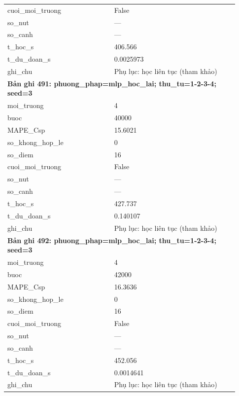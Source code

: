 \begin{longtable}{p{0.43\linewidth}p{0.50\linewidth}}
cuoi\_\allowbreak moi\_\allowbreak truong & False \\
so\_\allowbreak nut & — \\
so\_\allowbreak canh & — \\
t\_\allowbreak hoc\_\allowbreak s & 406.566 \\
t\_\allowbreak du\_\allowbreak doan\_\allowbreak s & 0.0025973 \\
ghi\_\allowbreak chu & Phụ lục: học liên tục (tham khảo) \\
\midrule
\multicolumn{2}{p{0.95\linewidth}}{\textbf{Bản ghi 491: phuong\_phap=mlp\_hoc\_lai; thu\_tu=1-2-3-4; seed=3}} \\
moi\_\allowbreak truong & 4 \\
buoc & 40000 \\
MAPE\_\allowbreak Csp & 15.6021 \\
so\_\allowbreak khong\_\allowbreak hop\_\allowbreak le & 0 \\
so\_\allowbreak diem & 16 \\
cuoi\_\allowbreak moi\_\allowbreak truong & False \\
so\_\allowbreak nut & — \\
so\_\allowbreak canh & — \\
t\_\allowbreak hoc\_\allowbreak s & 427.737 \\
t\_\allowbreak du\_\allowbreak doan\_\allowbreak s & 0.140107 \\
ghi\_\allowbreak chu & Phụ lục: học liên tục (tham khảo) \\
\midrule
\multicolumn{2}{p{0.95\linewidth}}{\textbf{Bản ghi 492: phuong\_phap=mlp\_hoc\_lai; thu\_tu=1-2-3-4; seed=3}} \\
moi\_\allowbreak truong & 4 \\
buoc & 42000 \\
MAPE\_\allowbreak Csp & 16.3636 \\
so\_\allowbreak khong\_\allowbreak hop\_\allowbreak le & 0 \\
so\_\allowbreak diem & 16 \\
cuoi\_\allowbreak moi\_\allowbreak truong & False \\
so\_\allowbreak nut & — \\
so\_\allowbreak canh & — \\
t\_\allowbreak hoc\_\allowbreak s & 452.056 \\
t\_\allowbreak du\_\allowbreak doan\_\allowbreak s & 0.0014641 \\
ghi\_\allowbreak chu & Phụ lục: học liên tục (tham khảo) \\

\end{longtable}

